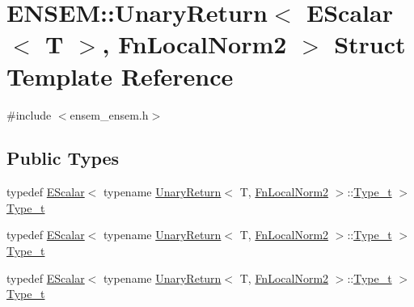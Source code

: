 \hypertarget{structENSEM_1_1UnaryReturn_3_01EScalar_3_01T_01_4_00_01FnLocalNorm2_01_4}{}\section{E\+N\+S\+EM\+:\+:Unary\+Return$<$ E\+Scalar$<$ T $>$, Fn\+Local\+Norm2 $>$ Struct Template Reference}
\label{structENSEM_1_1UnaryReturn_3_01EScalar_3_01T_01_4_00_01FnLocalNorm2_01_4}


{\ttfamily \#include $<$ensem\+\_\+ensem.\+h$>$}

\subsection*{Public Types}
\begin{DoxyCompactItemize}
\item 
typedef \mbox{\hyperlink{classENSEM_1_1EScalar}{E\+Scalar}}$<$ typename \mbox{\hyperlink{structENSEM_1_1UnaryReturn}{Unary\+Return}}$<$ T, \mbox{\hyperlink{structENSEM_1_1FnLocalNorm2}{Fn\+Local\+Norm2}} $>$\+::\mbox{\hyperlink{structENSEM_1_1UnaryReturn_3_01EScalar_3_01T_01_4_00_01FnLocalNorm2_01_4_ab80faba745e53e04277e860e474c3e19}{Type\+\_\+t}} $>$ \mbox{\hyperlink{structENSEM_1_1UnaryReturn_3_01EScalar_3_01T_01_4_00_01FnLocalNorm2_01_4_ab80faba745e53e04277e860e474c3e19}{Type\+\_\+t}}
\item 
typedef \mbox{\hyperlink{classENSEM_1_1EScalar}{E\+Scalar}}$<$ typename \mbox{\hyperlink{structENSEM_1_1UnaryReturn}{Unary\+Return}}$<$ T, \mbox{\hyperlink{structENSEM_1_1FnLocalNorm2}{Fn\+Local\+Norm2}} $>$\+::\mbox{\hyperlink{structENSEM_1_1UnaryReturn_3_01EScalar_3_01T_01_4_00_01FnLocalNorm2_01_4_ab80faba745e53e04277e860e474c3e19}{Type\+\_\+t}} $>$ \mbox{\hyperlink{structENSEM_1_1UnaryReturn_3_01EScalar_3_01T_01_4_00_01FnLocalNorm2_01_4_ab80faba745e53e04277e860e474c3e19}{Type\+\_\+t}}
\item 
typedef \mbox{\hyperlink{classENSEM_1_1EScalar}{E\+Scalar}}$<$ typename \mbox{\hyperlink{structENSEM_1_1UnaryReturn}{Unary\+Return}}$<$ T, \mbox{\hyperlink{structENSEM_1_1FnLocalNorm2}{Fn\+Local\+Norm2}} $>$\+::\mbox{\hyperlink{structENSEM_1_1UnaryReturn_3_01EScalar_3_01T_01_4_00_01FnLocalNorm2_01_4_ab80faba745e53e04277e860e474c3e19}{Type\+\_\+t}} $>$ \mbox{\hyperlink{structENSEM_1_1UnaryReturn_3_01EScalar_3_01T_01_4_00_01FnLocalNorm2_01_4_ab80faba745e53e04277e860e474c3e19}{Type\+\_\+t}}
\end{DoxyCompactItemize}


